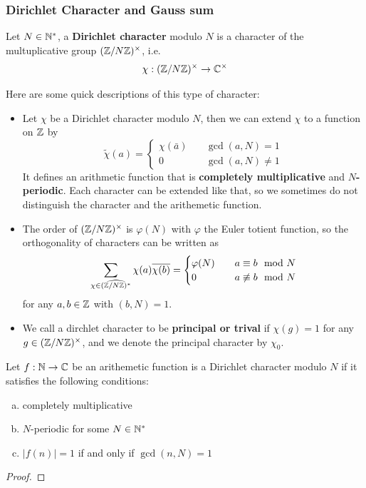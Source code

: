\subsubsection{Dirichlet Character and Gauss sum}

\begin{definition}
    Let \(N \in \mathbb{N}^*\), a \textbf{Dirichlet character} modulo \(N\) is a character of the multuplicative group \((\mathbb{Z}/N\mathbb{Z})^\times\), i.e. \
\[\chi: (\mathbb{Z}/N\mathbb{Z})^\times \to \mathbb{C}^\times\]
\end{definition}

Here are some quick descriptions of this type of character: 
\begin{itemize}

    \item Let \(\chi\) be a Dirichlet character modulo \(N\), then we can extend \(\chi\) to a function on \(\mathbb{Z}\) by \[\tilde{\chi}(a) = \begin{cases}
        \chi(\bar{a}) \quad &\gcd(a,N) = 1 \\
        0 \quad &\gcd(a,N) \neq 1
    \end{cases}\]
    It defines an arithmetic function that is \textbf{completely multiplicative} and \textbf{\(N\)-periodic}. Each character can be extended like that, so we sometimes do not distinguish the character and the arithemetic function.
    
    \item The order of \((\mathbb{Z}/N\mathbb{Z})^\times\) is \(\varphi(N)\) with \(\varphi\) the Euler totient function, so the orthogonality of characters can be written as
    \[\sum_{\chi \in \widehat{(\mathbb{Z}/N\mathbb{Z})^*}}\chi(a)\overline{\chi(b)} = \begin{cases}
    \varphi(N)  \quad &a \equiv b \mod N \\
    0 \quad &a \not\equiv b \mod N
    \end{cases} \]
    for any \(a,b \in \mathbb{Z}\) with \((b,N) = 1\).

    \item We call a dirchlet character to be \textbf{principal or trival} if \(\chi(g) = 1\) for any \(g \in (\mathbb{Z}/N\mathbb{Z})^\times\), and we denote the principal character by \(\chi_0\).
\end{itemize}


\begin{theorem}
    Let \(f: \mathbb{N} \to \mathbb{C}\) be an arithemetic function is a Dirichlet character modulo \(N\) if it satisfies the following conditions:
    \begin{enumerate} [(a)]
        \item completely multiplicative
        \item \(N\)-periodic for some \(N \in \mathbb{N}^*\)
        \item \(|f(n)| = 1\) if and only if \(\gcd(n,N) = 1\)
    \end{enumerate}
\end{theorem}
\begin{proof}
    
\end{proof}


